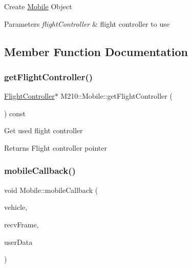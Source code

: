 Create \mbox{\hyperlink{class_m210_1_1_mobile}{Mobile}} Object 
\begin{DoxyParams}{Parameters}
{\em flight\+Controller} & flight controller to use \\
\hline
\end{DoxyParams}


\subsection{Member Function Documentation}
\mbox{\label{class_m210_1_1_mobile_ad4cdcfe5206d1aae2b62c457591ef480}} 
\subsubsection{\texorpdfstring{get\+Flight\+Controller()}{getFlightController()}}
{\footnotesize\ttfamily \mbox{\hyperlink{class_m210_1_1_flight_controller}{Flight\+Controller}}$\ast$ M210\+::\+Mobile\+::get\+Flight\+Controller (\begin{DoxyParamCaption}{ }\end{DoxyParamCaption}) const\hspace{0.3cm}{\ttfamily [inline]}}

Get used flight controller \begin{DoxyReturn}{Returns}
Flight controller pointer 
\end{DoxyReturn}
\mbox{\label{class_m210_1_1_mobile_a1213532d9326b0bbb8b679299c93a1a2}} 
\subsubsection{\texorpdfstring{mobile\+Callback()}{mobileCallback()}}
{\footnotesize\ttfamily void Mobile\+::mobile\+Callback (\begin{DoxyParamCaption}\item[{Vehicle $\ast$}]{vehicle,  }\item[{Recv\+Container}]{recv\+Frame,  }\item[{User\+Data}]{user\+Data }\end{DoxyParamCaption})\hspace{0.3cm}{\ttfamily [static]}}

